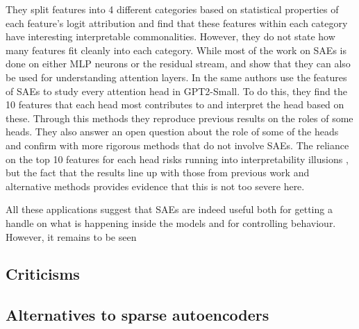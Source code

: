 \documentclass[../../main.tex]{subfiles}
\begin{document}
They split features into 4 different categories based on statistical properties of each feature's logit attribution and find that these features within each category have interesting interpretable commonalities.
However, they do not state how many features fit cleanly into each category.
While most of the work on SAEs is done on either MLP neurons or the residual stream, \citet{kissane_sparse_2024} and \citet{kissane_attention_2024} show that they can also be used for understanding attention layers.
In \citet{robertzk_we_2024} the same authors use the features of SAEs to study every attention head in GPT2-Small.
To do this, they find the 10 features that each head most contributes to and interpret the head based on these.
Through this methods they reproduce previous results on the roles of some heads.
They also answer an open question about the role of some of the heads and confirm with more rigorous methods that do not involve SAEs.
The reliance on the top 10 features for each head risks running into interpretability illusions \citep{bolukbasi_interpretability_2021}, but the fact that the results line up with those from previous work and alternative methods provides evidence that this is not too severe here. 

All these applications suggest that SAEs are indeed useful both for getting a handle on what is happening inside the models and for controlling behaviour.
However, it remains to be seen 



\subsection{Criticisms}



\subsection{Alternatives to sparse autoencoders}\label{sec:alternatives_to_saes}

\end{document}
